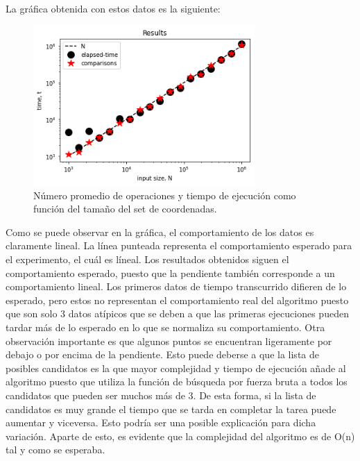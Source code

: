La gráfica obtenida con estos datos es la siguiente:

\begin{figure}[H]
	\centering
	\includegraphics[keepaspectratio, width = 0.75\textwidth]{Graphic.png}
	\caption{
	  Número promedio de operaciones y tiempo de ejecución como función del tamaño del set de coordenadas.  
	}
	\label{fig:best}
\end{figure}
Como se puede observar en la gráfica, el comportamiento de los datos es claramente lineal. La línea punteada representa el comportamiento esperado para el experimento, el cuál es líneal. Los resultados obtenidos siguen el comportamiento esperado, puesto que la pendiente también corresponde a un comportamiento lineal. Los primeros datos de tiempo transcurrido difieren de lo esperado, pero estos no representan el comportamiento real del algoritmo puesto que son solo 3 datos atípicos que se deben a que las primeras ejecuciones pueden tardar más de lo esperado en lo que se normaliza su comportamiento. Otra observación importante es que algunos puntos se encuentran ligeramente por debajo o por encima de la pendiente. Esto puede deberse a que la lista de posibles candidatos es la que mayor complejidad y tiempo de ejecución añade al algoritmo puesto que utiliza la función de búsqueda por fuerza bruta a todos los candidatos que pueden ser muchos más de 3. De esta forma, si la lista de candidatos es muy grande el tiempo que se tarda en completar la tarea puede aumentar y viceversa. Esto podría ser una posible explicación para dicha variación. Aparte de esto, es evidente que la complejidad del algoritmo es de O(n) tal y como se esperaba. 



